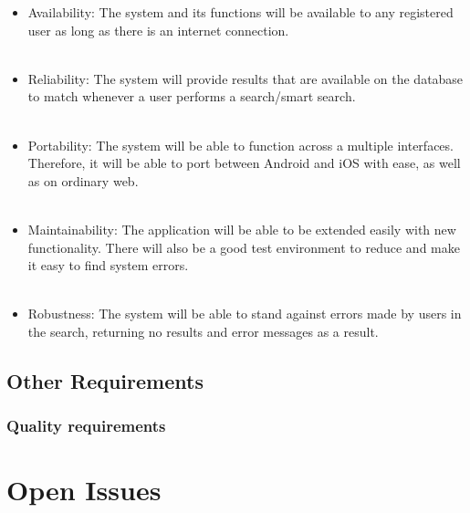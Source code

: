\documentclass[a4paper,10pt]{article}
\begin{document}
{\begin{itemize}
		\begin{itemize}
		\item Availability: The system and its functions will be available to any registered user as long as there is an internet connection. 
\\\\
		\item Reliability: The system will provide results that are available on the database to match whenever a user performs a search/smart search.
\\\\
		\item Portability: The system will be able to function across a multiple interfaces. Therefore, it will be able to port between Android and iOS with ease, as well as on ordinary web. 
\\\\
		\item Maintainability: The application will be able to be extended easily with new functionality. There will also be a good test environment to reduce and make it easy to find system errors.  
\\\\
		\item Robustness: The system will be able to stand against errors made by users in the search, returning no results and error messages as a result.
		\end{itemize}
        
	\subsection{Other Requirements}

\subsubsection{Quality requirements}
\begin{itemize}
	
\end{itemize}


\clearpage

\section{Open Issues}

\end{itemize}}
\end{document}
